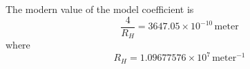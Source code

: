 \documentclass[12pt]{article}
\begin{document}
%
%
%
%
%

\noindent
The modern value of the model coefficient is
\begin{equation*}
\frac{4}{R_H}=3647.05\times10^{-10}\,\text{meter}
\end{equation*}
where
\begin{equation*}
R_H=1.09677576\times10^7\,\text{meter}^{-1}
\end{equation*}
\end{document}

